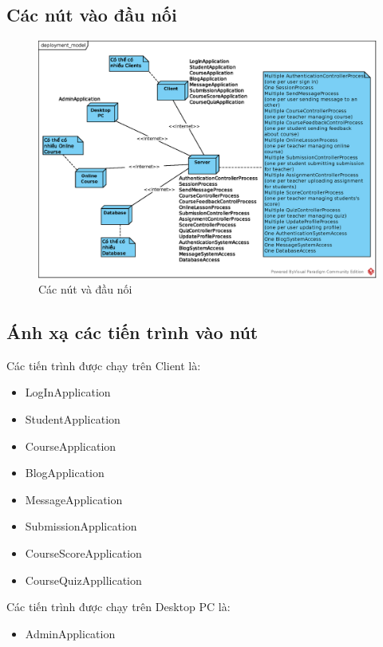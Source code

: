 \documentclass[./../main.tex]{subfiles}
\begin{document}
\subsection{Các nút vào đầu nối}
\begin{figure}[H]
	\centering
	\includegraphics[width=\linewidth]{./images/deployment_model.eps}
	\caption{Các nút và đầu nối}
\end{figure}
\subsection{Ánh xạ các tiến trình vào nút}
Các tiến trình được chạy trên Client là:
\begin{itemize}
	\item LogInApplication
	\item StudentApplication
	\item CourseApplication
	\item BlogApplication
	\item MessageApplication
	\item SubmissionApplication
	\item CourseScoreApplication
	\item CourseQuizAppllication
\end{itemize}
Các tiến trình được chạy trên Desktop PC là:
\begin{itemize}
	\item AdminApplication
\end{itemize}
\end{document}
